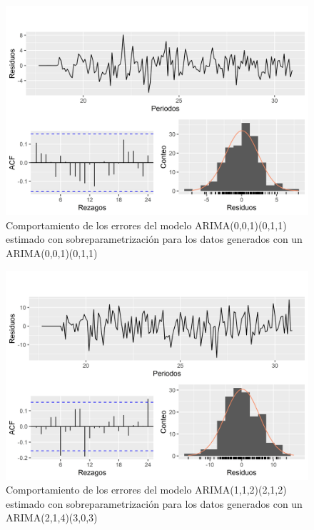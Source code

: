 \documentclass[
]{article}
\begin{document}
\begin{figure}[H]
\includegraphics[width=1\linewidth,height=1\textheight]{Tesis_files/figure-latex/errores_simulados_sobreparametrizacion5-1} \caption{Comportamiento de los errores del modelo ARIMA(0,0,1)(0,1,1) estimado con sobreparametrización para los datos generados con un ARIMA(0,0,1)(0,1,1)}\label{fig:errores_simulados_sobreparametrizacion5}
\end{figure}

\begin{figure}[H]
\includegraphics[width=1\linewidth,height=1\textheight]{Tesis_files/figure-latex/errores_simulados_sobreparametrizacion6-1} \caption{Comportamiento de los errores del modelo ARIMA(1,1,2)(2,1,2) estimado con sobreparametrización para los datos generados con un ARIMA(2,1,4)(3,0,3)}\label{fig:errores_simulados_sobreparametrizacion6}
\end{figure}
\end{document}
